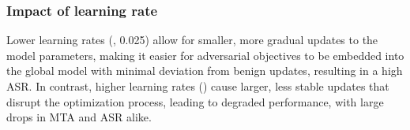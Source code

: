 
\subsubsection{Impact of learning rate}



Lower learning rates (, 0.025) allow for smaller, more gradual updates to the model parameters, making it easier for adversarial objectives to be embedded into the global model with minimal deviation from benign updates, resulting in a high ASR. In contrast, higher learning rates () cause larger, less stable updates that disrupt the optimization process, leading to degraded performance, with large drops in MTA and ASR alike.

